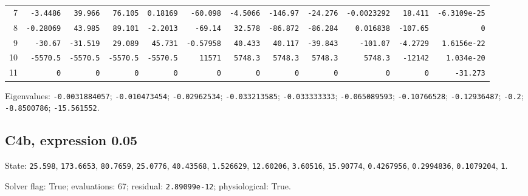 \begin{landscape}
\begin{tabular}{rrrrrrrrrrrr}
7 & \texttt{-3.4486} & \texttt{39.966} & \texttt{76.105} & \texttt{0.18169} & \texttt{-60.098} & \texttt{-4.5066} & \texttt{-146.97} & \texttt{-24.276} & \texttt{-0.0023292} & \texttt{18.411} & \texttt{-6.3109e-25} \\

8 & \texttt{-0.28069} & \texttt{43.985} & \texttt{89.101} & \texttt{-2.2013} & \texttt{-69.14} & \texttt{32.578} & \texttt{-86.872} & \texttt{-86.284} & \texttt{0.016838} & \texttt{-107.65} & \texttt{0} \\

9 & \texttt{-30.67} & \texttt{-31.519} & \texttt{29.089} & \texttt{45.731} & \texttt{-0.57958} & \texttt{40.433} & \texttt{40.117} & \texttt{-39.843} & \texttt{-101.07} & \texttt{-4.2729} & \texttt{1.6156e-22} \\

10 & \texttt{-5570.5} & \texttt{-5570.5} & \texttt{-5570.5} & \texttt{-5570.5} & \texttt{11571} & \texttt{5748.3} & \texttt{5748.3} & \texttt{5748.3} & \texttt{5748.3} & \texttt{-12142} & \texttt{1.034e-20} \\

11 & \texttt{0} & \texttt{0} & \texttt{0} & \texttt{0} & \texttt{0} & \texttt{0} & \texttt{0} & \texttt{0} & \texttt{0} & \texttt{0} & \texttt{-31.273} \\

\bottomrule\end{tabular}\par\endgroup

{\scriptsize Eigenvalues: \texttt{-0.0031884057}; \texttt{-0.010473454}; \texttt{-0.02962534}; \texttt{-0.033213585}; \texttt{-0.033333333}; \texttt{-0.065089593}; \texttt{-0.10766528}; \texttt{-0.12936487}; \texttt{-0.2}; \texttt{-8.8500786}; \texttt{-15.561552}.\par}

\clearpage
\subsection*{C4b, expression 0.05}
{\scriptsize State: \texttt{25.598}, \texttt{173.6653}, \texttt{80.7659}, \texttt{25.0776}, \texttt{40.43568}, \texttt{1.526629}, \texttt{12.60206}, \texttt{3.60516}, \texttt{15.90774}, \texttt{0.4267956}, \texttt{0.2994836}, \texttt{0.1079204}, \texttt{1}.\par

Solver flag: True; evaluations: 67; residual: \texttt{2.89099e-12}; physiological: True.\par}


\end{landscape}

